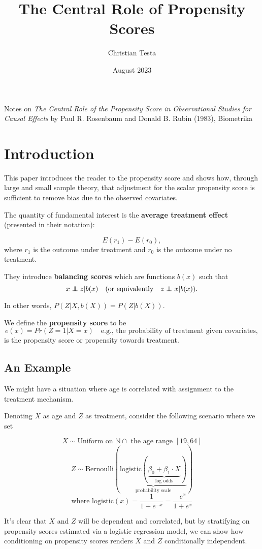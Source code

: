 \documentclass{article}
\title{The Central Role of Propensity Scores}
\author{Christian Testa}
\date{August 2023}
\newcommand\independent{\protect\mathpalette{\protect\independenT}{\perp}}
\def\independenT#1#2{\mathrel{\rlap{$#1#2$}\mkern2mu{#1#2}}}
\newcommand{\vocab}[1]{\textcolor{PineGreen}{\textbf{#1}}}
\begin{document}
\maketitle

{\Large Notes on \textit{The Central Role of the Propensity Score in Observational Studies for Causal Effects} by Paul R. Rosenbaum and Donald B. Rubin (1983), Biometrika}

\section{Introduction}


This paper introduces the reader to the 
propensity score and shows how, through large and
small sample theory, that adjustment
for the scalar propensity score is sufficient
to remove bias due to the observed covariates. 

The quantity of fundamental interest is the 
\vocab{average treatment effect} (presented in their notation): 

$$E(r_1) - E(r_0),$$
where $r_1$ is the outcome under treatment and 
$r_0$ is the outcome under no treatment. 

They introduce \vocab{balancing scores} which are functions $b(x)$ such that 
$$x \independent z | b(x) \quad (\text{or equivalently} \quad  z \independent x | b(x)).$$

In other words, $P(Z|X,b(X)) = P(Z|b(X))$.

We define the \vocab{propensity score} to be 
$$e(x) = Pr(Z=1|X = x) \quad \text{e.g., the probability of treatment given covariates},$$
is the propensity score or propensity towards treatment. 

\subsection{An Example}

We might have a situation where age
is correlated with assignment to the treatment
mechanism. 

Denoting $X$ as age and $Z$ as treatment, consider the following scenario where we set 

$$X \sim \text{Uniform on } \mathbb N \cap \text{ the age range } [19,64]$$
$$Z \sim \text{Bernoulli}(\underbrace{\text{logistic}(\underbrace{\beta_0 + \beta_1 \cdot X}_{\text{log odds}})}_{\text{probability scale}})$$
$$ \text{where logistic}(x) = \frac{1}{1+e^{-x}} = \frac{e^x}{1+e^x}$$

It's clear that $X$ and $Z$ will be dependent and correlated, but by stratifying
on propensity scores estimated via a logistic regression model, we can show 
how conditioning on propensity scores renders $X$ and $Z$ conditionally independent.
\end{document}
